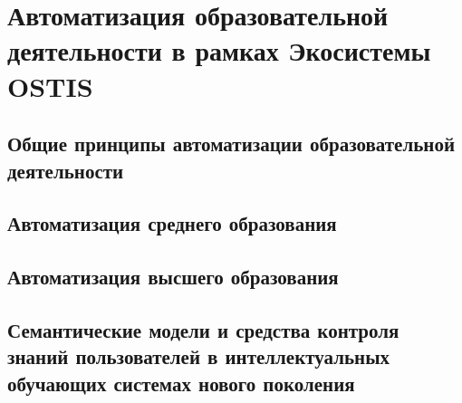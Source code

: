\chapter{Автоматизация образовательной деятельности в рамках Экосистемы OSTIS}
\label{chapter_learning_systems}


\section{Общие принципы автоматизации образовательной деятельности}
\section{Автоматизация среднего образования}
\section{Автоматизация высшего образования}
\section{Семантические модели и средства контроля знаний пользователей в интеллектуальных обучающих системах нового поколения}
\label{section_knowledge_control}

%